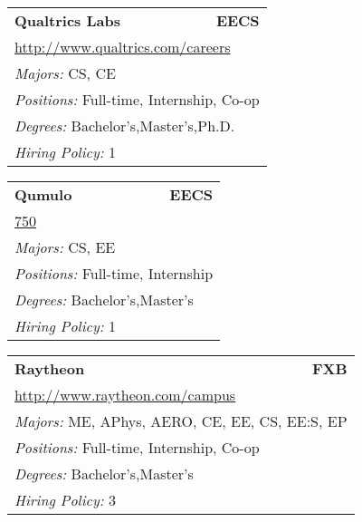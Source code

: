 \documentclass[twoside]{article}
\begin{document}
\begin{center}
\begin{multicols}{3}
\begin{FlushLeft}
\begin{minipage}{.9\columnwidth}
\end{minipage}
 
\begin{minipage}{.9\columnwidth}\begin{tabularx}{.95\columnwidth}{Xr}
                 {\Large\bf Qualtrics Labs} & {\Large\bf EECS}\\
    \multicolumn{2}{p{.95\columnwidth}}{\url{http://www.qualtrics.com/careers}}\\
    \multicolumn{2}{p{.95\columnwidth}}{\emph{Majors:} CS, CE}\\
    \multicolumn{2}{p{.95\columnwidth}}{\emph{Positions:} Full-time, Internship, Co-op}\\
    \multicolumn{2}{p{.95\columnwidth}}{\emph{Degrees:} Bachelor's,Master's,Ph.D.}\\
    \multicolumn{2}{p{.95\columnwidth}}{\emph{Hiring Policy:} 1}\\
    \end{tabularx}
    
\end{minipage}
 
\begin{minipage}{.9\columnwidth}\begin{tabularx}{.95\columnwidth}{Xr}
                 {\Large\bf Qumulo} & {\Large\bf EECS}\\
    \multicolumn{2}{p{.95\columnwidth}}{\url{750}}\\
    \multicolumn{2}{p{.95\columnwidth}}{\emph{Majors:} CS, EE}\\
    \multicolumn{2}{p{.95\columnwidth}}{\emph{Positions:} Full-time, Internship}\\
    \multicolumn{2}{p{.95\columnwidth}}{\emph{Degrees:} Bachelor's,Master's}\\
    \multicolumn{2}{p{.95\columnwidth}}{\emph{Hiring Policy:} 1}\\
    \end{tabularx}
    
\end{minipage}
 
\begin{minipage}{.9\columnwidth}\begin{tabularx}{.95\columnwidth}{Xr}
                 {\Large\bf Raytheon} & {\Large\bf FXB}\\
    \multicolumn{2}{p{.95\columnwidth}}{\url{http://www.raytheon.com/campus}}\\
    \multicolumn{2}{p{.95\columnwidth}}{\emph{Majors:} ME, APhys, AERO, CE, EE, CS, EE:S, EP}\\
    \multicolumn{2}{p{.95\columnwidth}}{\emph{Positions:} Full-time, Internship, Co-op}\\
    \multicolumn{2}{p{.95\columnwidth}}{\emph{Degrees:} Bachelor's,Master's}\\
    \multicolumn{2}{p{.95\columnwidth}}{\emph{Hiring Policy:} 3}\\
    \end{tabularx}
    

\end{minipage}
\end{FlushLeft}
\end{multicols}
\end{center}
\end{document}
